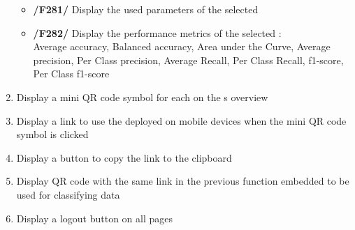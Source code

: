 \begin{enumerate}[{label = \textbf{/F{\protect\twodigits{\arabic{enumi}}}0/}, leftmargin = *}]
    \begin{itemize}
        \item \label{itm:models-over-1}\textbf{/F281/} Display the used parameters of the selected 
        \item \label{itm:models-over-2}\textbf{/F282/} Display the performance metrics of the selected : \\Average \Gls{accuracy}, Balanced \Gls{accuracy}, Area under the Curve, Average \Gls{precision}, Per Class \Gls{precision}, Average Recall, Per Class Recall, \gls{f1-score}, Per Class \gls{f1-score}
    \end{itemize}
    \item \label{itm:disp-miniqr-classify}Display a mini \gls{QR code} symbol for each  on the s overview
    \item \label{itm:disp-link-classify}Display a link to use the deployed  on mobile devices when the mini \gls{QR code} symbol is clicked
    \item \label{itm:disp-copy-classify}Display a button to copy the link to the clipboard
    \item \label{itm:disp-qr-classify}Display \gls{QR code} with the same link in the previous function embedded to be used for classifying data
    \item Display a logout button on all pages
\end{enumerate}

